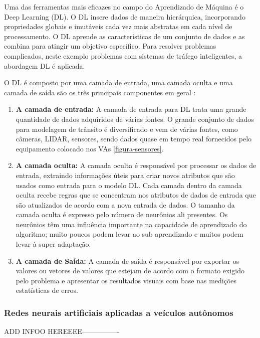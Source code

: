 
Uma das ferramentas mais eficazes no campo do Aprendizado de Máquina é o Deep Learning (DL). O DL insere dados de maneira hierárquica, incorporando propriedades globais e imutáveis cada vez mais abstratas em cada nível de processamento. O DL aprende as características de um conjunto de dados e as combina para atingir um objetivo específico. Para resolver problemas complicados, neste exemplo problemas com sistemas de tráfego inteligentes, a abordagem DL é aplicada. 

O DL é composto por uma camada de entrada, uma camada oculta e uma camada de saída são os três principais componentes em geral \cite{software-ia}:

\begin{enumerate}
 \item \textbf{A camada de entrada:} A camada de entrada para DL trata uma grande quantidade de dados adquiridos de várias fontes. O grande conjunto de dados para modelagem de trânsito é diversificado e vem de várias fontes, como câmeras, LIDAR, sensores, sendo dados quase em tempo real fornecidos pelo equipamento colocado nos VAs \ref{figura-sensores}.
\item \textbf{A camada oculta:} A camada oculta é responsável por processar os dados de entrada, extraindo informações úteis para criar novos atributos que são usados como entrada para o modelo DL. Cada camada dentro da camada oculta recebe regras que se concentram nos atributos de dados de entrada que são atualizados de acordo com a nova entrada de dados. O tamanho da camada oculta é expresso pelo número de neurônios ali presentes. Os neurônios têm uma influência importante na capacidade de aprendizado do algoritmo; muito poucos podem levar ao sub aprendizado e muitos podem levar à super adaptação.
\item \textbf{A camada de Saída:} A camada de saída é responsável por exportar os valores ou vetores de valores que estejam de acordo com o formato exigido pelo problema e apresentar os resultados visuais com base nas medições estatísticas de erros.
\end{enumerate}

\subsubsection{Redes neurais artificiais aplicadas a veículos autônomos}

ADD INFOO HEREEEE----------------



